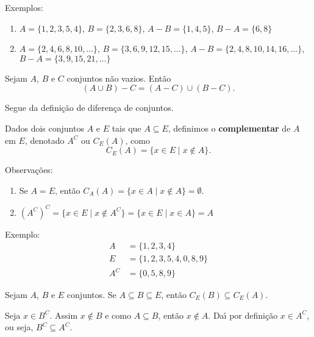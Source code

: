 Exemplos:
\begin{enumerate}
\item $A=\{1,2,3,5,4\}$, $B=\{2,3,6,8\}$, $A-B=\{1,4,5\}$, $B-A=\{6,8\}$
\item $A=\{2,4,6,8,10,...\}$,  $B=\{3,6,9,12,15,...\}$, $A-B=\{2,4,8,10,14,16,...\}$, $B - A=\{3,9,15,21,...\}$
\end{enumerate}

\begin{proposicao}
	Sejam $A$, $B$ e $C$ conjuntos n\~ao vazios. Ent\~ao
	\[(A \cup B) - C = (A - C) \cup (B - C).\]
\end{proposicao}
\begin{prova}
	Segue da defini\c{c}\~ao de diferen\c{c}a de conjuntos.
\end{prova}

\begin{definicao}[Complementar]
Dados dois conjuntos $A$ e $E$ tais que $A\subseteq E$, definimos o \textbf{complementar} de $A$ em $E$, denotado $A^C$ ou $C_E(A)$, como
\[
	C_E(A) = \{ x \in E \mid x \notin A \}.
\]
\end{definicao}

Observa{\c c}{\~o}es:
\begin{enumerate}
\item Se $A = E$, ent{\~a}o $C_A(A) = \{ x \in A \mid x \notin A \} = \emptyset$.
\item $(A^C)^C = \{x \in E \mid x \notin A^C\} = \{ x \in E \mid x \in A \} = A$
\end{enumerate}

Exemplo:
\begin{align*}
	A &= \{1,2,3,4\}\\
	E &= \{1,2,3,5,4,0,8,9\}\\
	A^C &= \{0,5,8,9\}
\end{align*}

\begin{proposicao}
	Sejam $A$, $B$ e $E$ conjuntos. Se $A\subseteq B\subseteq E$, ent{\~a}o $C_E(B)\subseteq C_E(A)$.
\end{proposicao}
\begin{prova}
	Seja $x \in B^C$. Assim $x\notin B$ e como $A \subseteq B$, ent\~ao $x \notin A$. Da{\'\i} por defini\c{c}\~ao $x\in A^C$, ou seja, $B^C\subseteq A^C$.
\end{prova}

